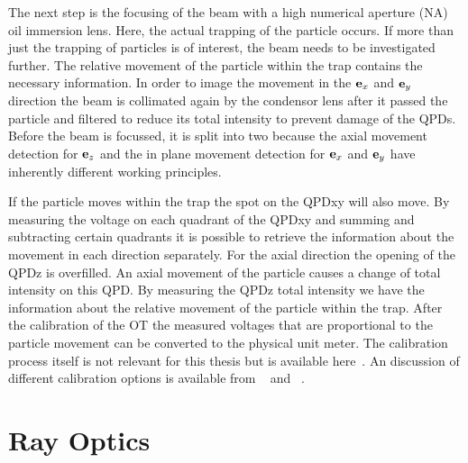 The next step is the focusing of the beam with a high numerical aperture (NA) 
oil immersion lens. Here, the actual trapping of the particle occurs. If more 
than just the trapping of particles is of interest, the beam needs to be 
investigated further. The relative movement of the particle within the trap 
contains the necessary information. In order to image the movement in the $\vb{e}_{x}$ 
and $\vb{e}_{y}$ direction the beam is collimated again by the condensor lens after it 
passed the particle and filtered to reduce its total intensity to prevent 
damage of the QPDs. Before the beam is focussed, it is split into two because 
the axial movement detection for $\vb{e}_{z}$ and the in plane movement detection for 
$\vb{e}_{x}$ and $\vb{e}_{y}$ have inherently different working principles.

If the particle moves within the trap the spot on the QPDxy will also move. By 
measuring the voltage on each quadrant of the QPDxy and summing and subtracting 
certain quadrants it is possible to retrieve the information about the movement 
in each direction separately. For the axial direction the opening of the QPDz 
is overfilled. An axial movement of the particle causes a change of total 
intensity on this QPD. By measuring the QPDz total intensity we have the 
information about the relative movement of the particle within the trap. After 
the calibration of the OT the measured voltages that are proportional to the 
particle movement can be converted to the physical unit meter. The calibration 
process itself is not relevant for this thesis but is available 
here~\cite{Lamprecht2017}. An discussion of different calibration options is 
available from \citeauthor{Svoboda1994}~\cite{Svoboda1994} and 
\citeauthor{Jun2004}~\cite{Jun2004}.

\section{Ray Optics\label{sec:Th-rayoptics}}

